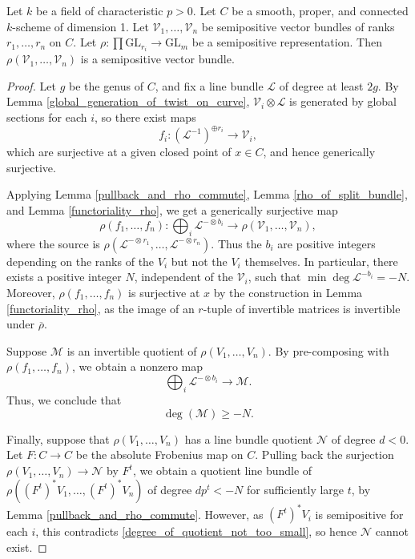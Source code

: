 \begin{lemma}\label{no_negative_quotient_on_curve_p}
Let $k$ be a field of characteristic $p > 0$.
Let $C$ be a smooth, proper, and connected $k$-scheme of dimension 1.
Let $\mathcal{V}_1,\ldots,\mathcal{V}_n$ be semipositive vector bundles of
ranks $r_1,\ldots,r_n$ on $C$.
Let $\rho : \prod \mathrm{GL}_{r_i}\to \mathrm{GL}_m$ be a semipositive
representation.
Then $\rho(\mathcal{V}_1,\ldots,\mathcal{V}_n)$ is a semipositive vector bundle.
\end{lemma}
\begin{proof}
Let $g$ be the genus of $C$, and fix a line bundle $\mathcal{L}$ of degree at
least $2g$.
By Lemma \ref{global_generation_of_twist_on_curve},
$\mathcal{V}_i \otimes\mathcal{L}$ is generated by global sections for each
$i$, so there exist maps
$$
  f_i : (\mathcal{L}^{-1})^{\oplus r_i} \to \mathcal{V}_i,
$$
which are surjective at a given closed point of $x \in C$, and hence
generically surjective.

Applying Lemma \ref{pullback_and_rho_commute}, Lemma \ref{rho_of_split_bundle},
and Lemma \ref{functoriality_rho}, we get a generically surjective map
$$
  \rho(f_1,\ldots,f_n) :
    \bigoplus_i \mathcal{L}^{-\otimes b_i} \to
    \rho(\mathcal{V}_1,\ldots,\mathcal{V}_n),
$$
where the source is
$\rho(\mathcal{L}^{-\otimes r_1},\ldots,\mathcal{L}^{-\otimes r_n})$.
Thus the $b_i$ are positive integers depending on the ranks of the $V_i$ but
not the $V_i$ themselves.
In particular, there exists a positive integer $N$, independent of the
$\mathcal{V}_i$, such that $\min\deg\mathcal{L}^{-b_i} = -N$.
Moreover, $\rho(f_1,\ldots,f_n)$ is surjective at $x$ by the construction in
Lemma \ref{functoriality_rho}, as the image of an $r$-tuple of invertible
matrices is invertible under $\overline{\rho}$.

Suppose $\mathcal{M}$ is an invertible quotient of $\rho(V_1,\ldots,V_n)$.
By pre-composing with $\rho(f_1,\ldots,f_n)$, we obtain a nonzero map
$$
  \bigoplus_i \mathcal{L}^{-\otimes b_i} \to \mathcal{M}.
$$
Thus, we conclude that
\begin{equation}\label{degree_of_quotient_not_too_small}
  \deg(\mathcal{M}) \ge -N.
\end{equation}

Finally, suppose that $\rho(V_1,\ldots,V_n)$ has a line bundle quotient
$\mathcal{N}$ of degree $d < 0$.
Let $F : C \to C$ be the absolute Frobenius map on $C$.
Pulling back the surjection $\rho(V_1,\ldots,V_n) \to \mathcal{N}$ by $F^t$,
we obtain a quotient line bundle of
$\rho((F^t)^* V_1,\ldots,(F^t)^* V_n)$ of degree $dp^t < -N$ for sufficiently
large $t$, by Lemma \ref{pullback_and_rho_commute}.
However, as $(F^{t})^*V_i$ is semipositive for each $i$, this contradicts
\eqref{degree_of_quotient_not_too_small}, so hence $\mathcal{N}$ cannot exist.
\end{proof}

